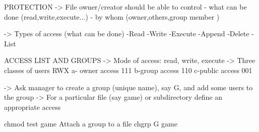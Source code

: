                         PROTECTION
-> File owner/creator should be able to control
    - what can be done (read,write,execute...)
    - by whom (owner,others,group member )

-> Types of access (what can be done)
-Read 
-Write
-Execute 
-Append
-Delete
-List 

                        ACCESS LIST AND GROUPS     
-> Mode of access: read, write, execute 
-> Three classes of users 
                            RWX
        a- owner access     111
        b-group access      110
        c-public access     001

-> Ask manager to create a group (unique name), say G, and add some users 
to the group 
-> For a particular file (say game) or subdirectory define an appropriate access 

                            chmod test game 
Attach a group to a file 
                            chgrp G game 






































